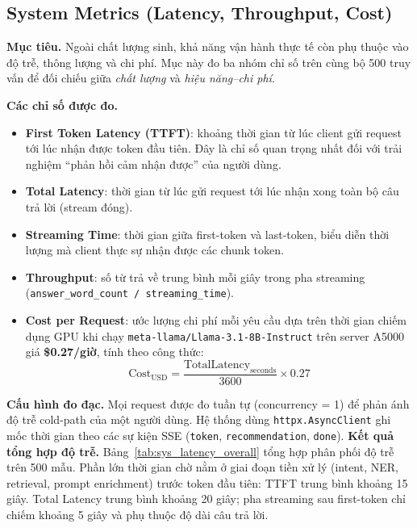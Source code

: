 \subsection{System Metrics (Latency, Throughput, Cost)}

\textbf{Mục tiêu.}
Ngoài chất lượng sinh, khả năng vận hành thực tế còn phụ thuộc vào độ trễ, thông lượng và chi phí. Mục này đo ba nhóm chỉ số trên cùng bộ 500 truy vấn để đối chiếu giữa \emph{chất lượng} và \emph{hiệu năng--chi phí}.

\textbf{Các chỉ số được đo.}
\begin{itemize}
    \item \textbf{First Token Latency (TTFT)}: khoảng thời gian từ lúc client gửi request tới lúc nhận được token đầu tiên. Đây là chỉ số quan trọng nhất đối với trải nghiệm ``phản hồi cảm nhận được'' của người dùng.
    \item \textbf{Total Latency}: thời gian từ lúc gửi request tới lúc nhận xong toàn bộ câu trả lời (stream đóng).
    \item \textbf{Streaming Time}: thời gian giữa first-token và last-token, biểu diễn thời lượng mà client thực sự nhận được các chunk token.
    \item \textbf{Throughput}: số từ trả về trung bình mỗi giây trong pha streaming (\texttt{answer\_word\_count / streaming\_time}).
    \item \textbf{Cost per Request}: ước lượng chi phí mỗi yêu cầu dựa trên thời gian chiếm dụng GPU khi chạy \texttt{meta-llama/Llama-3.1-8B-Instruct} trên server A5000 giá \textbf{\$0.27/giờ}, tính theo công thức:
    \[
    \text{Cost}_{\text{USD}} = \frac{\text{TotalLatency}_{\text{seconds}}}{3600} \times 0.27
    \]
\end{itemize}

\textbf{Cấu hình đo đạc.}
Mọi request được đo tuần tự (concurrency = 1) để phản ánh độ trễ cold-path của một người dùng. Hệ thống dùng \texttt{httpx.AsyncClient} ghi mốc thời gian theo các sự kiện SSE (\texttt{token}, \texttt{recommendation}, \texttt{done}).
\textbf{Kết quả tổng hợp độ trễ.}
Bảng~\ref{tab:sys_latency_overall} tổng hợp phân phối độ trễ trên 500 mẫu. Phần lớn thời gian chờ nằm ở giai đoạn tiền xử lý (intent, NER, retrieval, prompt enrichment) trước token đầu tiên: TTFT trung bình khoảng 15 giây. Total Latency trung bình khoảng 20 giây; pha streaming sau first-token chỉ chiếm khoảng 5 giây và phụ thuộc độ dài câu trả lời.


